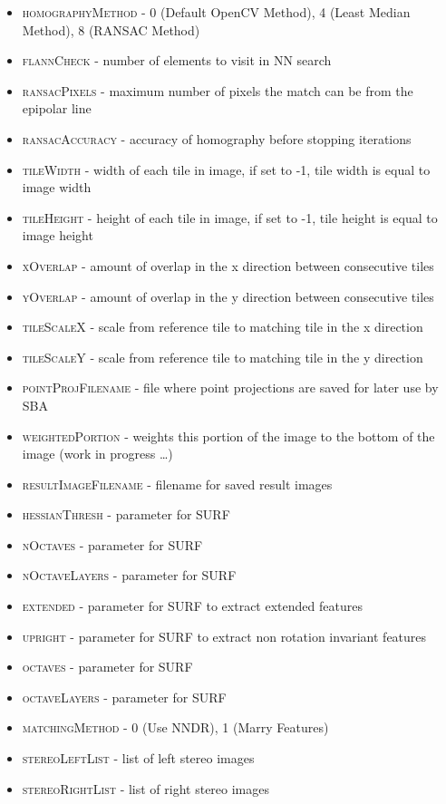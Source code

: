\begin{itemize}
	\item{\textsc{homographyMethod}} - 0 (Default OpenCV Method), 4 (Least Median Method), 8 (RANSAC Method)
	\item{\textsc{flannCheck}} - number of elements to visit in NN search
	\item{\textsc{ransacPixels}} - maximum number of pixels the match can be from the epipolar line
	\item{\textsc{ransacAccuracy}} - accuracy of homography before stopping iterations
	\item{\textsc{tileWidth}} - width of each tile in image, if set to -1, tile width is equal to image width
	\item{\textsc{tileHeight}} - height of each tile in image, if set to -1, tile height is equal to image height
	\item{\textsc{xOverlap}} - amount of overlap in the x direction between consecutive tiles
	\item{\textsc{yOverlap}} - amount of overlap in the y direction between consecutive tiles
	\item{\textsc{tileScaleX}} - scale from reference tile to matching tile in the x direction
	\item{\textsc{tileScaleY}} - scale from reference tile to matching tile in the y direction
	\item{\textsc{pointProjFilename}} - file where point projections are saved for later use by SBA
	\item{\textsc{weightedPortion}} - weights this portion of the image to the bottom of the image (work in progress \ldots)
	\item{\textsc{resultImageFilename}} - filename for saved result images
	\item{\textsc{hessianThresh}} - parameter for SURF
	\item{\textsc{nOctaves}} - parameter for SURF
	\item{\textsc{nOctaveLayers}} - parameter for SURF
	\item{\textsc{extended}} - parameter for SURF to extract extended features
	\item{\textsc{upright}} - parameter for SURF to extract non rotation invariant features
	\item{\textsc{octaves}} - parameter for SURF
	\item{\textsc{octaveLayers}} - parameter for SURF
	\item{\textsc{matchingMethod}} - 0 (Use NNDR), 1 (Marry Features)
	\item{\textsc{stereoLeftList}} - list of left stereo images
	\item{\textsc{stereoRightList}} - list of right stereo images
\end{itemize}


